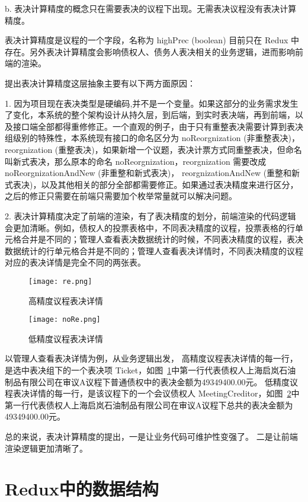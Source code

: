   \quad{}b. 表决计算精度的概念只在需要表决的议程下出现。无需表决议程没有表决计算精度。

  表决计算精度是议程的一个字段，名称为 highPrec (boolean) 目前只在 Redux 中存在。另外表决计算精度会影响债权人、债务人表决相关的业务逻辑，进而影响前端的渲染。

  提出表决计算精度这层抽象主要有以下两方面原因：

  1. 因为项目现在表决类型是硬编码,并不是一个变量。如果这部分的业务需求发生了变化，本系统的整个架构设计从持久层，到后端，到实时表决端，再到前端，以及接口端全部都得重修修正。一个直观的例子，由于只有重整表决需要计算到表决组级别的特殊性，本系统现有接口的命名区分为 noReorgnization (非重整表决)，reorgnization (重整表决)，如果新增一个议题，表决计票方式同重整表决，但命名叫新式表决，那么原本的命名 noReorgnization，reorgnization 需要改成 noReorgnizationAndNew (非重整和新式表决)， reorgnizationAndNew (重整和新式表决)，以及其他相关的部分全部都需要修正。如果通过表决精度来进行区分，之后的修正只需要在前端只需要加个枚举常量就可以解决问题。

  2. 表决计算精度决定了前端的渲染，有了表决精度的划分，前端渲染的代码逻辑会更加清晰。例如，债权人的投票表格中，不同表决精度的议程，投票表格的行单元格合并是不同的；管理人查看表决数据统计的时候，不同表决精度的议程，表决数据统计的行单元格合并是不同的；管理人查看表决详情时，不同表决精度的议程对应的表决详情是完全不同的两张表。
  \begin{figure}[!htp]
    \centering
    \texttt{[image: re.png]}
    \caption{高精度议程表决详情}
    \label{fig:reo}
  \end{figure}
  \begin{figure}[!htp]
    \centering
    \texttt{[image: noRe.png]}
    \caption{低精度议程表决详情}
    \label{fig:noReo}
  \end{figure}
  以管理人查看表决详情为例，从业务逻辑出发，
  高精度议程表决详情的每一行，是选中表决组下的一个表决项 Ticket，如图~\ref{fig:reo}中第一行代表债权人上海启岚石油制品有限公司在审议A议程下普通债权中的表决金额为49349400.00元。
  低精度议程表决详情的每一行，是该议程下的一个会议债权人 MeetingCreditor，如图~\ref{fig:noReo}中第一行代表债权人上海启岚石油制品有限公司在审议A议程下总共的表决金额为49349400.00元。

  总的来说，表决计算精度的提出，一是让业务代码可维护性变强了。
  二是让前端渲染逻辑更加清晰了。

  \section{Redux中的数据结构}

